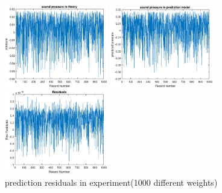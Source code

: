 \documentclass[runningheads,a4paper]{llncs}
\begin{document}
\begin{figure}[bthp]
  \begin{minipage}{0.28\linewidth}
    \centerline{\includegraphics[width=4.5cm]{Experimentwith1000data_pressure.eps}}
  \end{minipage}
  \hfill
  \begin{minipage}{.28\linewidth}
    \centerline{\includegraphics[width=4.5cm]{Experimentwith1000data_PressurePredicted.eps}}
  \end{minipage}
  \hfill
  \begin{minipage}{0.28\linewidth}
    \centerline{\includegraphics[width=4.5cm]{Experimentwith1000data_Residuals.eps}}
  \end{minipage}
  \vfill
  \caption{prediction residuals in experiment(1000 different weights)}\label{fig:250Hz}
  \label{fig:Experimentwith1000data_Residuals}
\end{figure}
\end{document}
